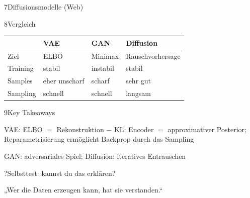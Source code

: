 \begin{hngrid}
\begin{hnp}[raster multicolumn=3,acc=hnteal]{7}{Diffusionsmodelle (Web)}
\end{hnp}
%
\begin{hnp}[raster multicolumn=3,acc=hnpurple]{8}{Vergleich}
\renewcommand{\arraystretch}{1.22}
\begin{tabular}{@{}p{1.2cm}p{2.0cm}p{2.0cm}p{2.5cm}@{}}
\hline
&\textbf{VAE}&\textbf{GAN}&\textbf{Diffusion}\\\hline
Ziel&ELBO&Minimax&Rauschvorhersage\\
Training&stabil&instabil&stabil\\
Samples&eher unscharf&scharf&sehr gut\\
Sampling&schnell&schnell&langsam\\\hline
\end{tabular}
\end{hnp}
%
\begin{hnp}[raster multicolumn=6,acc=hnorange]{9}{Key Takeaways}
\begin{hnchk}
\item VAE: ELBO $=$ Rekonstruktion $-$ KL; Encoder $=$ approximativer Posterior; Reparametrisierung ermöglicht Backprop durch das Sampling
\item GAN: adversariales Spiel; Diffusion: iteratives Entrauschen
\end{hnchk}
\end{hnp}
%
\begin{hnp}[raster multicolumn=6,acc=hnpurple,colback=hnlilac!30]{?}{Selbsttest: kannst du das erklären?}
\end{hnp}
%
\begin{hnbanner}[raster multicolumn=6]
„Wer die Daten erzeugen kann, hat sie verstanden.“
\end{hnbanner}
\end{hngrid}
